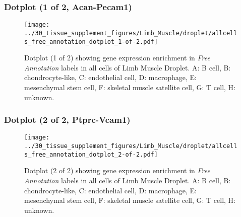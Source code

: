 \clearpage

\subsubsection{Dotplot (1 of 2, Acan-Pecam1)}
\begin{figure}[h]
\centering
\texttt{[image: ../30\_tissue\_supplement\_figures/Limb\_Muscle/droplet/allcells\_free\_annotation\_dotplot\_1-of-2.pdf]}

\caption{ Dotplot (1 of 2)  showing gene expression enrichment in \emph{Free Annotation} labels in all cells of Limb Muscle Droplet. A: B cell, B: chondrocyte-like, C: endothelial cell, D: macrophage, E: mesenchymal stem cell, F: skeletal muscle satellite cell, G: T cell, H: unknown.}
\end{figure}


\clearpage

\subsubsection{Dotplot (2 of 2, Ptprc-Vcam1)}
\begin{figure}[h]
\centering
\texttt{[image: ../30\_tissue\_supplement\_figures/Limb\_Muscle/droplet/allcells\_free\_annotation\_dotplot\_2-of-2.pdf]}

\caption{ Dotplot (2 of 2)  showing gene expression enrichment in \emph{Free Annotation} labels in all cells of Limb Muscle Droplet. A: B cell, B: chondrocyte-like, C: endothelial cell, D: macrophage, E: mesenchymal stem cell, F: skeletal muscle satellite cell, G: T cell, H: unknown.}
\end{figure}

